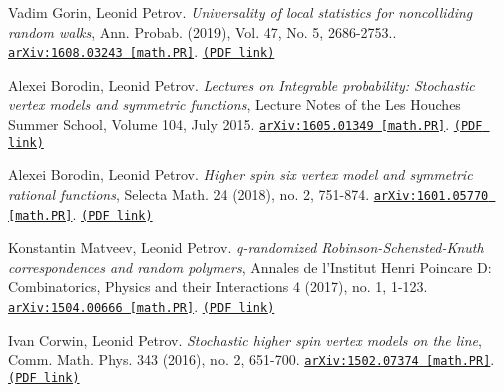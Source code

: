 \documentclass[letterpaper,11pt]{article}
\begin{document}
\begin{etaremune}
\item 
Vadim Gorin, Leonid Petrov.
\emph{Universality of local statistics for noncolliding random walks}, Ann. Probab. (2019), Vol. 47, No. 5, 2686-2753.. 
\href{https://arxiv.org/abs/1608.03243}{\texttt{arXiv:1608.03243 [math.PR]}}. \href{https://storage.lpetrov.cc/research_files/Petrov-publ/22-publ-petrov-uva-j.pdf}{\texttt{(PDF link)}}



\item 
Alexei Borodin, Leonid Petrov.
\emph{Lectures on Integrable probability: Stochastic vertex models and symmetric functions}, Lecture Notes of the Les Houches Summer School, Volume 104, July 2015. 
\href{https://arxiv.org/abs/1605.01349}{\texttt{arXiv:1605.01349 [math.PR]}}. \href{https://storage.lpetrov.cc/research_files/Petrov-publ/21-publ-petrov-uva.pdf}{\texttt{(PDF link)}}



\item 
Alexei Borodin, Leonid Petrov.
\emph{Higher spin six vertex model and symmetric rational functions}, Selecta Math. 24 (2018), no. 2, 751-874. 
\href{https://arxiv.org/abs/1601.05770}{\texttt{arXiv:1601.05770 [math.PR]}}. \href{https://storage.lpetrov.cc/research_files/Petrov-publ/20-publ-petrov-uva.pdf}{\texttt{(PDF link)}}









\item 
Konstantin Matveev, Leonid Petrov.
\emph{q-randomized Robinson-Schensted-Knuth correspondences and random polymers}, Annales de l’Institut Henri Poincare D: Combinatorics, Physics and their Interactions 4 (2017), no. 1, 1-123. 
\href{https://arxiv.org/abs/1504.00666}{\texttt{arXiv:1504.00666 [math.PR]}}. \href{https://storage.lpetrov.cc/research_files/Petrov-publ/19-publ-petrov-uva.pdf}{\texttt{(PDF link)}}





\item 
Ivan Corwin, Leonid Petrov.
\emph{Stochastic higher spin vertex models on the line}, Comm. Math. Phys. 343 (2016), no. 2, 651-700. 
\href{https://arxiv.org/abs/1502.07374}{\texttt{arXiv:1502.07374 [math.PR]}}. \href{https://storage.lpetrov.cc/research_files/Petrov-publ/18-publ-petrov-uva.pdf}{\texttt{(PDF link)}}














\end{etaremune}
\end{document}
